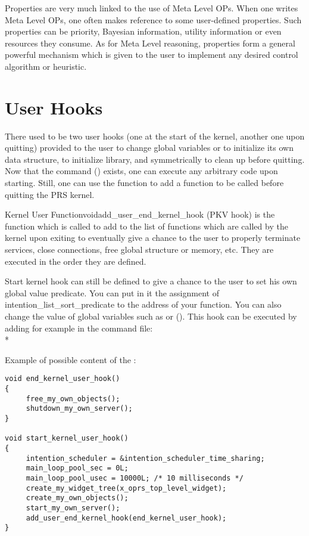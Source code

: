Properties are very much linked to the use of Meta Level OPs. When one writes
Meta Level OPs, one often makes reference to some user-defined properties. Such
properties can be priority, Bayesian information, utility information or even
resources they consume. As for Meta Level reasoning, properties form a general
powerful mechanism which is given to the user to implement any desired control
algorithm or heuristic.

\section{User Hooks}

There used to be two user hooks (one at the start of the kernel, another one
upon quitting)  provided to the user to change global variables or to
initialize its own data structure, to initialize library, and symmetrically to
clean up before quitting. Now that the  command
() exists, one can execute any
  arbitrary code upon starting. Still, one can use the
   function to add a function to be called before
  quitting the PRS kernel.

\begin{typefn}{Kernel User Function}{void}{add\_user\_end\_kernel\_hook} {(PKV hook)}
is the function which is called to add  to the list of functions which
are called by the kernel upon exiting to eventually give a
chance to the user to properly terminate services, close connections, free
global structure or memory, etc. They are executed in the order they are defined.

\end{typefn}

Start kernel hook can still be defined to give a chance to the user to set his
own global value predicate. You can put in it the assignment of
intention\_list\_sort\_predicate to the address of your function.  You can also
change the value of global variables such as  or
 ().
This hook  can be executed by adding for example in the command file:\\*

Example of possible content of the :
\begin{verbatim}
void end_kernel_user_hook()
{
     free_my_own_objects();
     shutdown_my_own_server();
}
 
void start_kernel_user_hook()
{
     intention_scheduler = &intention_scheduler_time_sharing;
     main_loop_pool_sec = 0L;
     main_loop_pool_usec = 10000L; /* 10 milliseconds */
     create_my_widget_tree(x_oprs_top_level_widget);
     create_my_own_objects();
     start_my_own_server();
     add_user_end_kernel_hook(end_kernel_user_hook);
}
\end{verbatim}

